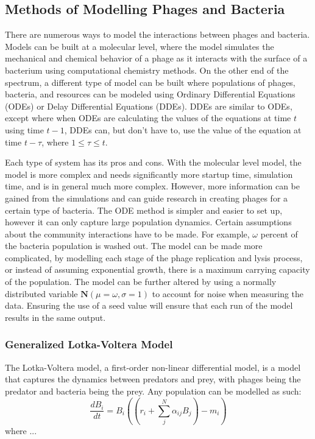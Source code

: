 \subsection{Methods of Modelling Phages and Bacteria}
There are numerous ways to model the interactions between phages and bacteria.
 Models can be built at a molecular level, where the model simulates the mechanical and chemical behavior of a phage as it interacts with the surface of a bacterium using computational chemistry methods.
 On the other end of the spectrum, a different type of model can be built where populations of phages, bacteria, and resources can be modeled using Ordinary Differential Equations (ODEs) or Delay Differential Equations (DDEs).
 DDEs are similar to ODEs, except where when ODEs are calculating the values of the equations at time $t$ using time $t-1$, DDEs can, but don't have to, use the value of the equation at time $t-\tau$, where $1 \leq \tau \leq t$. \newline 

Each type of system has its pros and cons.
 With the molecular level model, the model is more complex and needs significantly more startup time, simulation time, and is in general much more complex.
 However, more information can be gained from the simulations and can guide research in creating phages for a certain type of bacteria.
 The ODE method is simpler and easier to set up, however it can only capture large population dynamics.
 Certain assumptions about the community interactions have to be made.
 For example, $\omega$ percent of the bacteria population is washed out.
 The model can be made more complicated, by modelling each stage of the phage replication and lysis process, or instead of assuming exponential growth, there is a maximum carrying capacity of the population.
 The model can be further altered by using a normally distributed variable $\textbf{N}(\mu=\omega, \sigma=1)$ to account for noise when measuring the data.
 Ensuring the use of a seed value will ensure that each run of the model results in the same output. 

\subsubsection{Generalized Lotka-Voltera Model}
The Lotka-Voltera model, a first-order non-linear differential model, is a model that captures the dynamics between predators and prey, with phages being the predator and bacteria being the prey.
 Any population can be modelled as such:
\[ 
    \frac{d{B}_i}{dt} = {B}_i \left(\left(r_i + \sum_{j}^{N} \alpha_{ij}{B}_j \right) - m_i\right)
\]
where ... 

